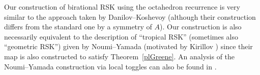 \documentclass[ALCO,Unicode,published]{cedram}
\numberwithin{equation}{section}
\begin{document}
Our construction of birational RSK using the octahedron recurrence is very similar to the approach taken by Danilov--Koshevoy \cite{danilovkoshevoy} (although their construction differs from the standard one by a symmetry of $A$). Our construction is also necessarily equivalent to the description of ``tropical RSK'' (sometimes also ``geometric RSK'') given by Noumi--Yamada \cite{noumiyamada} (motivated by Kirillov \cite{kirillov}) since their map is also constructed to satisfy Theorem~\ref{plGreene}. An analysis of the Noumi--Yamada construction via local toggles can also be found in \cite{osz}.









\end{document}
